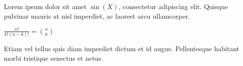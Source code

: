 \documentclass{article}
\begin{document}
Lorem ipsum dolor sit amet $\sin(X)$, consectetur adipiscing elit.
Quisque pulvinar mauris at nisl imperdiet, ac laoreet arcu ullamcorper.

\begin{math}
\frac{n!}{k!(n-k)!} = \binom{n}{k}
\end{math}

Etiam vel tellus quis diam imperdiet dictum et id augue.
Pellentesque habitant morbi tristique senectus et netus.
\end{document}
